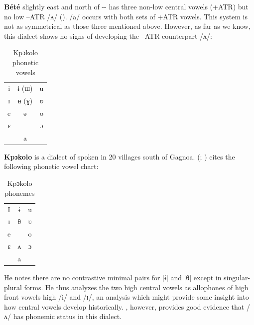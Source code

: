 \documentclass[output=paper,newtxmath,modfonts,nonflat,draft]{langsci/langscibook}
\begin{document}
\textbf{ Bété} slightly east and north of -- has three non-low central vowels (+ATR) but no low –ATR /ʌ/ (\citealt{Zogbo2005}). /a/ occurs with both sets of +ATR vowels. This system is not as symmetrical as those three mentioned above. However, as far as we know, this dialect shows no signs of developing the –ATR counterpart /ʌ/: 

\begin{table}
\begin{tabular}{ccc}
i  &  ɨ (ɯ) &   u\\

ɪ  &  ʉ (ɣ)  &  ʋ\\

e  &  ə  &  o\\

ɛ  &   &   ɔ\\

&a&\\
\end{tabular}
\caption{Kpↄkolo phonetic vowels}
\label{tab:zogbo:11}
\end{table}

\textbf{Kpɔkolo} is a dialect of  spoken in 20 villages south of Gagnoa. \citeauthor{Goprou2014} (\citeyear{Goprou2010}; \citeyear[175, 179]{Goprou2014}) cites the following phonetic vowel chart: 

\begin{table}
\caption{Kpↄkolo phonemes}
\label{tab:zogbo:12}
\begin{tabular}{ccc}
I  &  ɨ  &  u\\

ɪ  &  θ  &  ʋ\\

e   & &    o\\

ɛ   & ʌ  &  ɔ\\

	& a\\
\end{tabular}	
\end{table}

He notes there are no contrastive minimal pairs for [ɨ] and [θ] except in sin\-gular-plu\-ral forms. He thus analyzes the two high central vowels as allophones of high front vowels high /i/ and /ɪ/, an analysis which might provide some insight into how central vowels develop historically. \citet{Vahoua2011}, however, provides good evidence that /ʌ/ has phonemic status in this dialect.    
\end{document}
